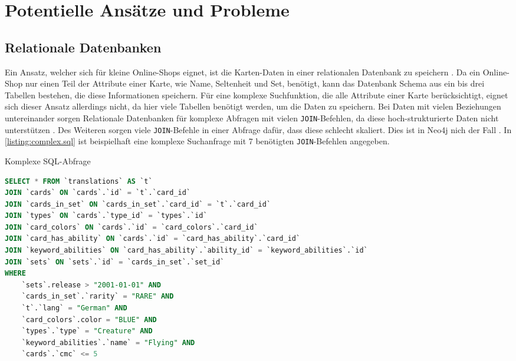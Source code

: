 \section{Potentielle Ansätze und Probleme}\label{ch:ansaetze-probleme}

\subsection{Relationale Datenbanken}
Ein Ansatz, welcher sich für kleine Online-Shops eignet, ist die Karten-Daten in einer relationalen Datenbank zu speichern \cite{johnson2013online}. Da ein Online-Shop nur einen Teil der Attribute einer Karte, wie Name, Seltenheit und Set, benötigt, kann das Datenbank Schema aus ein bis drei Tabellen bestehen, die diese Informationen speichern. Für eine komplexe Suchfunktion, die alle Attribute einer Karte berücksichtigt, eignet sich dieser Ansatz allerdings nicht, da hier viele Tabellen benötigt werden, um die Daten zu speichern. Bei Daten mit vielen Beziehungen untereinander sorgen Relationale Datenbanken für komplexe Abfragen mit vielen \verb|JOIN|-Befehlen, da diese hoch-strukturierte Daten nicht unterstützen \cite{robinsongraph:2015}. Des Weiteren sorgen viele \verb|JOIN|-Befehle in einer Abfrage dafür, dass diese schlecht skaliert. Dies ist in Neo4j nich der Fall \cite{robinsongraph:2015}. In \autoref{listing:complex.sql} ist beispielhaft eine komplexe Suchanfrage mit 7 benötigten \verb|JOIN|-Befehlen angegeben.

\begin{listing}[t]
    \caption{Komplexe SQL-Abfrage}
    \label{listing:complex.sql}
    \begin{lstlisting}[language=SQL]
SELECT * FROM `translations` AS `t` 
JOIN `cards` ON `cards`.`id` = `t`.`card_id`
JOIN `cards_in_set` ON `cards_in_set`.`card_id` = `t`.`card_id`
JOIN `types` ON `cards`.`type_id` = `types`.`id`
JOIN `card_colors` ON `cards`.`id` = `card_colors`.`card_id`
JOIN `card_has_ability` ON `cards`.`id` = `card_has_ability`.`card_id`
JOIN `keyword_abilities` ON `card_has_ability`.`ability_id` = `keyword_abilities`.`id`
JOIN `sets` ON `sets`.`id` = `cards_in_set`.`set_id`
WHERE
    `sets`.release > "2001-01-01" AND
    `cards_in_set`.`rarity` = "RARE" AND
    `t`.`lang` = "German" AND
    `card_colors`.color = "BLUE" AND
    `types`.`type` = "Creature" AND
    `keyword_abilities`.`name` = "Flying" AND
    `cards`.`cmc` <= 5
    \end{lstlisting}
\end{listing}


